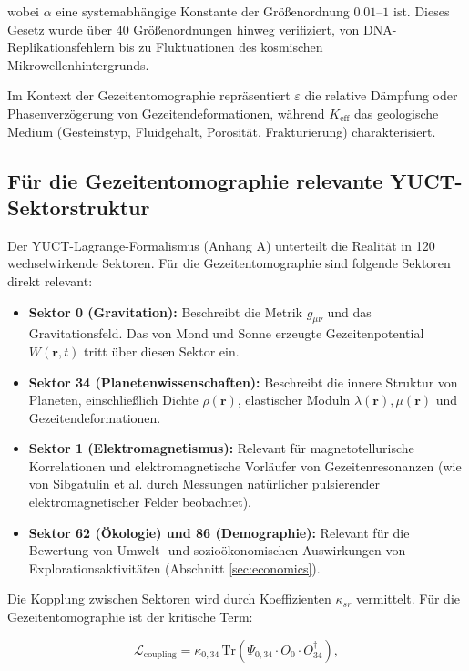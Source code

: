 \documentclass[12pt,a4paper]{article}
\theoremstyle{remark}
\newcommand{\Keff}{K_{\mathrm{eff}}}
\newcommand{\eps}{\varepsilon}
\begin{document}
	wobei $\alpha$ eine systemabhängige Konstante der Größenordnung $0.01$–$1$ ist. Dieses Gesetz wurde über 40 Größenordnungen hinweg verifiziert, von DNA-Replikationsfehlern bis zu Fluktuationen des kosmischen Mikrowellenhintergrunds.
	
	Im Kontext der Gezeitentomographie repräsentiert $\eps$ die relative Dämpfung oder Phasenverzögerung von Gezeitendeformationen, während $\Keff$ das geologische Medium (Gesteinstyp, Fluidgehalt, Porosität, Frakturierung) charakterisiert.
	
	\subsection{Für die Gezeitentomographie relevante YUCT-Sektorstruktur}
	
	Der YUCT-Lagrange-Formalismus (Anhang A) unterteilt die Realität in 120 wechselwirkende Sektoren. Für die Gezeitentomographie sind folgende Sektoren direkt relevant:
	
	\begin{itemize}
		\item \textbf{Sektor 0 (Gravitation):} Beschreibt die Metrik $g_{\mu\nu}$ und das Gravitationsfeld. Das von Mond und Sonne erzeugte Gezeitenpotential $W(\mathbf{r},t)$ tritt über diesen Sektor ein.
		\item \textbf{Sektor 34 (Planetenwissenschaften):} Beschreibt die innere Struktur von Planeten, einschließlich Dichte $\rho(\mathbf{r})$, elastischer Moduln $\lambda(\mathbf{r}), \mu(\mathbf{r})$ und Gezeitendeformationen.
		\item \textbf{Sektor 1 (Elektromagnetismus):} Relevant für magnetotellurische Korrelationen und elektromagnetische Vorläufer von Gezeitenresonanzen (wie von Sibgatulin et al. \cite{Sibgatulin2014} durch Messungen natürlicher pulsierender elektromagnetischer Felder beobachtet).
		\item \textbf{Sektor 62 (Ökologie) und 86 (Demographie):} Relevant für die Bewertung von Umwelt- und sozioökonomischen Auswirkungen von Explorationsaktivitäten (Abschnitt \ref{sec:economics}).
	\end{itemize}
	
	Die Kopplung zwischen Sektoren wird durch Koeffizienten $\kappa_{sr}$ vermittelt. Für die Gezeitentomographie ist der kritische Term:
	
	\begin{equation}
		\mathcal{L}_{\text{coupling}} = \kappa_{0,34} \, \mathrm{Tr}\left(\Psi_{0,34} \cdot O_0 \cdot O_{34}^\dagger\right),
		\label{eq:coupling}
	\end{equation}
	
\end{document}

